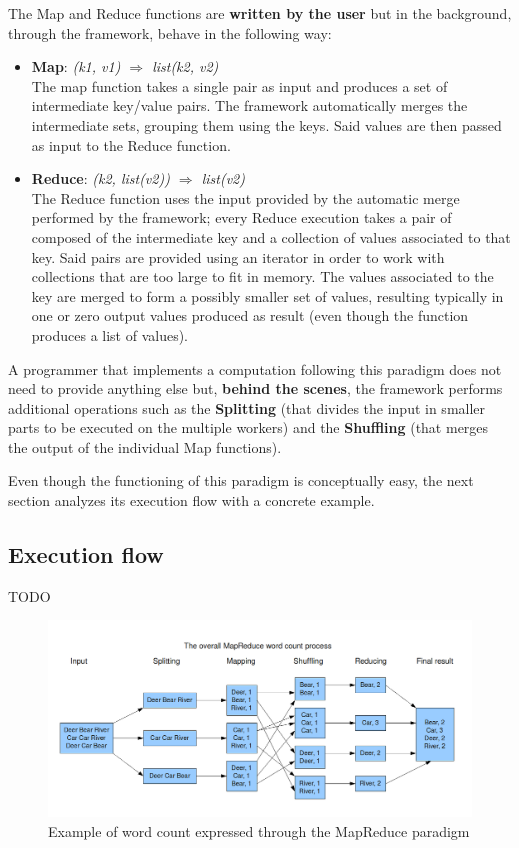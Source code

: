 The Map and Reduce functions are \textbf{written by the user} but in the background, through the framework, behave in the following way:
\begin{itemize}
    \item \textbf{Map}: \textit{(k1, v1) $\Longrightarrow$ list(k2, v2)}\\
    The map function takes a single pair as input and produces a set of intermediate key/value pairs. The framework automatically merges the intermediate sets, grouping them using the keys. Said values are then passed as input to the Reduce function.
    \item \textbf{Reduce}: \textit{(k2, list(v2)) $\Longrightarrow$ list(v2)}\\
    The Reduce function uses the input provided by the automatic merge performed by the framework; every Reduce execution takes a pair of composed of the intermediate key and a collection of values associated to that key. Said pairs are provided using an iterator in order to work with collections that are too large to fit in memory. The values associated to the key are merged to form a possibly smaller set of values, resulting typically in one or zero output values produced as result (even though the function produces a list of values).
\end{itemize}
A programmer that implements a computation following this paradigm does not need to provide anything else but, \textbf{behind the scenes}, the framework performs additional operations such as the \textbf{Splitting} (that divides the input in smaller parts to be executed on the multiple workers) and the \textbf{Shuffling} (that merges the output of the individual Map functions).

Even though the functioning of this paradigm is conceptually easy, the next section analyzes its execution flow with a concrete example.

\subsection{Execution flow}
TODO

\begin{figure}[H]
    \centering
    \includegraphics[width=\linewidth]{document/chapters/chapter_4/images/mapreduce_example.png}
    \caption{Example of word count expressed through the MapReduce paradigm \cite{mapreduce_example_site}}
    \label{fig:mapreduce_example}
\end{figure}

